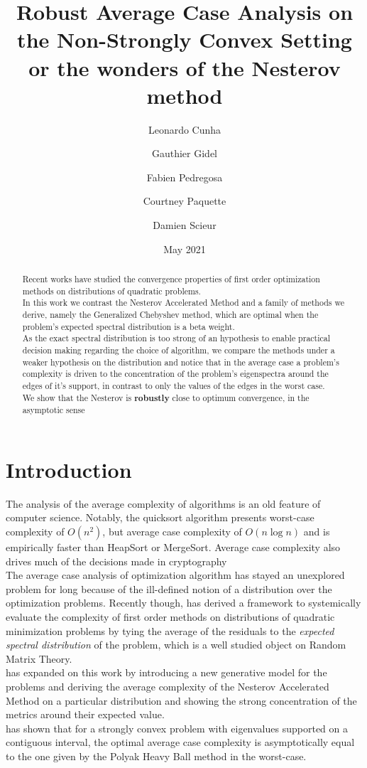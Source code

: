 \documentclass{article}
\title{Robust Average Case Analysis on the Non-Strongly Convex Setting \\
or the wonders of the Nesterov method}
\author{Leonardo Cunha
\and Gauthier Gidel \\
\and Fabien Pedregosa \\
\and Courtney Paquette \\
\and Damien Scieur}
\date{May 2021}
\begin{document}
\maketitle
\begin{abstract}
    Recent works \cite{pedregosa2020acceleration,paquette2020halting,scieur2020universal} have studied the convergence properties of first order optimization methods on distributions of quadratic problems. \\
    In this work we contrast the Nesterov Accelerated Method \cite{nesterov2003introductory} and a family of methods we derive,  namely the Generalized Chebyshev method, which are optimal when the problem's expected spectral distribution is a beta weight.\\
    As the exact spectral distribution is too strong of an hypothesis to enable practical decision making regarding the choice of algorithm, we compare the methods under a weaker hypothesis on the distribution and notice that in the average case a problem's complexity is driven to the concentration of the problem's eigenspectra around the edges of it's support, in contrast to  only the values of the edges in the worst case. \\
    We show that the Nesterov is \textbf{robustly} close to optimum convergence, in the asymptotic sense
\end{abstract}
\section{Introduction}
The analysis of the average complexity of algorithms is an old feature of computer science. Notably, the quicksort algorithm presents worst-case complexity of $O(n^2)$, but average case complexity of $O(n\log n)$ and is  empirically faster than HeapSort or MergeSort. Average case complexity also drives much of the decisions made in cryptography \cite{bogdanov2006average}\\
The average case analysis of optimization algorithm has stayed an unexplored problem for long because of the ill-defined notion of a distribution over the optimization problems. Recently though, \cite{pedregosa2020acceleration} has derived a framework to systemically evaluate the complexity of first order methods on distributions of quadratic minimization problems by tying the average of the residuals to the \textit{expected spectral distribution} of the problem, which is a well studied object on Random Matrix Theory. \\
\cite{paquette2020halting} has expanded on this work by introducing a new generative model for the problems and deriving the average complexity of the Nesterov Accelerated Method on a particular distribution and showing the strong concentration of the metrics around their expected value. \\
\cite{scieur2020universal} has shown that for a strongly convex problem with eigenvalues supported on a contiguous interval, the optimal average case complexity is asymptotically equal to the one given by the Polyak Heavy Ball method in the worst-case.  
\end{document}
